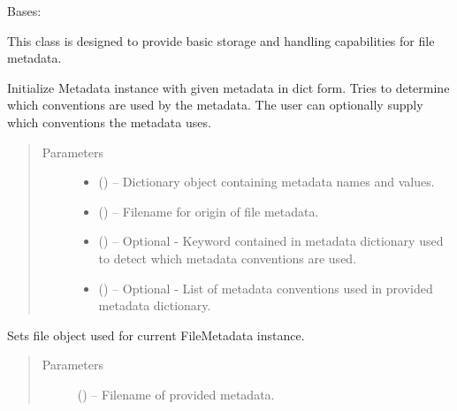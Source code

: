 \documentclass[a4paper,10pt,openany,english]{sphinxmanual}
\begin{document}
\begin{fulllineitems}
\label{egadsapi:egads.core.metadata.FileMetadata}
Bases: {\hyperref[egadsapi:egads.core.metadata.Metadata]{}}

This class is designed to provide basic storage and handling capabilities
for file metadata.

Initialize Metadata instance with given metadata in dict form. Tries to
determine which conventions are used by the metadata. The user can optionally
supply which conventions the metadata uses.
\begin{quote}\begin{description}
\item[{Parameters}] \leavevmode\begin{itemize}
\item {} 
 () -- Dictionary object containing metadata names and values.

\item {} 
 () -- Filename for origin of file metadata.

\item {} 
 () -- Optional -
Keyword contained in metadata dictionary used to detect which metadata
conventions are used.

\item {} 
 () -- Optional -
List of metadata conventions used in provided metadata dictionary.

\end{itemize}

\end{description}\end{quote}

\begin{fulllineitems}
\label{egadsapi:egads.core.metadata.FileMetadata.set_filename}
Sets file object used for current FileMetadata instance.
\begin{quote}\begin{description}
\item[{Parameters}] \leavevmode
{} () -- Filename of provided metadata.

\end{description}\end{quote}

\end{fulllineitems}


\end{fulllineitems}
\end{document}
